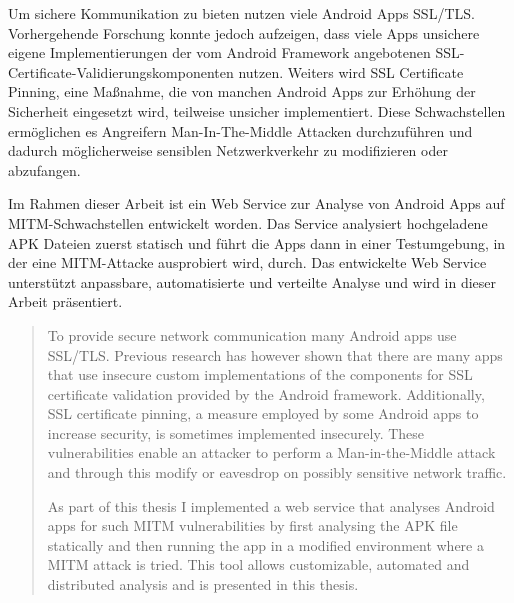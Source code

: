 \documentclass[draft,final]{vutinfth} %
\begin{document}
\frontmatter %

\addstatementpage

\begin{kurzfassung}
Um sichere Kommunikation zu bieten nutzen viele Android Apps SSL/TLS. Vorhergehende Forschung konnte jedoch aufzeigen, dass viele Apps unsichere eigene Implementierungen der vom Android Framework angebotenen SSL-Certificate-Validierungskomponenten nutzen. Weiters wird SSL Certificate Pinning, eine Maßnahme, die von manchen Android Apps zur Erhöhung der Sicherheit eingesetzt wird, teilweise unsicher implementiert. Diese Schwachstellen ermöglichen es Angreifern Man-In-The-Middle Attacken durchzuführen und dadurch möglicherweise sensiblen Netzwerkverkehr zu modifizieren oder abzufangen.

Im Rahmen dieser Arbeit ist ein Web Service zur Analyse von Android Apps auf MITM-Schwachstellen entwickelt worden. Das Service analysiert hochgeladene APK Dateien zuerst statisch und führt die Apps dann in einer Testumgebung, in der eine MITM-Attacke ausprobiert wird, durch. Das entwickelte Web Service unterstützt anpassbare, automatisierte und verteilte Analyse und wird in dieser Arbeit präsentiert.
\end{kurzfassung}

\begin{abstract}
To provide secure network communication many Android apps use SSL/TLS. Previous research has however shown that there are many apps that use insecure custom implementations of the components for SSL certificate validation provided by the Android framework. Additionally, SSL certificate pinning, a measure employed by some Android apps to increase security, is sometimes implemented insecurely. These vulnerabilities enable an attacker to perform a Man-in-the-Middle attack and through this modify or eavesdrop on possibly sensitive network traffic. 

As part of this thesis I implemented a web service that analyses Android apps for such MITM vulnerabilities by first analysing the APK file statically and then running the app in a modified environment where a MITM attack is tried. This tool allows customizable, automated and distributed analysis and is presented in this thesis.
\end{abstract}
\end{document}
